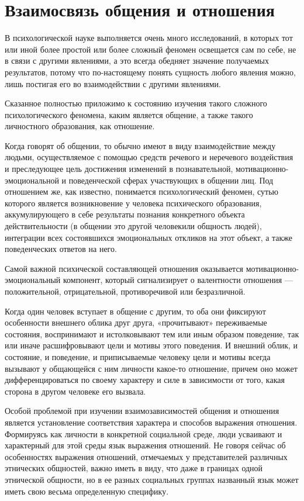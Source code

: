\chapter{Взаимосвязь общения и отношения}
В психологической науке выполняется очень много исследований, в которых тот или иной более простой или более сложный феномен освещается сам по себе, не в связи с другими явлениями, а это всегда обедняет значение получаемых результатов, потому что по-настоящему понять сущность любого явления можно, лишь постигая его во взаимодействии с другими явлениями. \cite{17}

Сказанное полностью приложимо к состоянию изучения такого сложного психологического феномена, каким является общение, а также такого личностного образования, как отношение. 

Когда говорят об общении, то обычно имеют в виду взаимодействие между людьми, осуществляемое с помощью средств речевого и неречевого воздействия и преследующее цель достижения изменений в познавательной, мотивационно-эмоциональной и поведенческой сферах участвующих в общении лиц. Под отношением же, как известно, понимается психологический феномен, сутью которого является возникновение у человека психического образования, аккумулирующего в себе результаты познания конкретного объекта действительности (в общении это другой человекили общность людей), интеграции всех состоявшихся эмоциональных откликов на этот объект, а также поведенческих ответов на него. 

Самой важной психической составляющей отношения оказывается мотивационно-эмоциональный компонент, который сигнализирует о валентности отношения — положительной, отрицательной, противоречивой или безразличной.

Когда один человек вступает в общение с другим, то оба они фиксируют особенности внешнего облика друг друга, «прочитывают» переживаемые состояния, воспринимают и истолковывают тем или иным образом поведение, так или иначе расшифровывают цели и мотивы этого поведения. И внешний облик, и состояние, и поведение, и приписываемые человеку цели и мотивы всегда вызывают у общающейся с ним личности какое-то отношение, причем оно может дифференцироваться по своему характеру и силе в зависимости от того, какая сторона в другом человеке его вызвала. 

Особой проблемой при изучении взаимозависимостей общения и отношения является установление соответствия характера и способов выражения отношения. Формируясь как личности в конкретной социальной среде, люди усваивают и характерный для этой среды язык выражения отношений. Не говоря сейчас об особенностях выражения отношений, отмечаемых у представителей различных этнических общностей, важно иметь в виду, что даже в границах одной этнической общности, но в ее разных социальных группах названный язык может иметь свою весьма определенную специфику.

